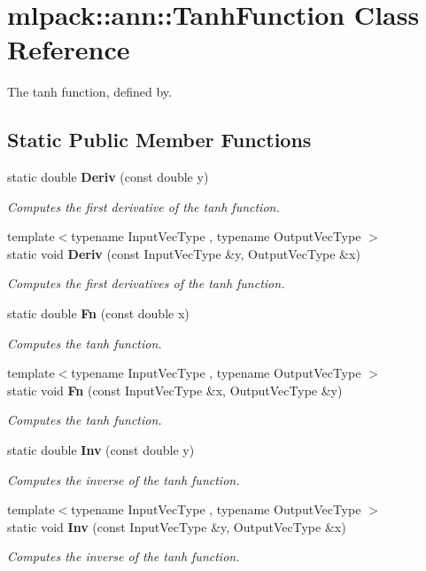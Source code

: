 \section{mlpack\+:\+:ann\+:\+:Tanh\+Function Class Reference}
\label{classmlpack_1_1ann_1_1TanhFunction}


The tanh function, defined by.  


\subsection*{Static Public Member Functions}
\begin{DoxyCompactItemize}
\item 
static double {\bf Deriv} (const double y)
\begin{DoxyCompactList}\small\item\em Computes the first derivative of the tanh function. \end{DoxyCompactList}\item 
{\footnotesize template$<$typename Input\+Vec\+Type , typename Output\+Vec\+Type $>$ }\\static void {\bf Deriv} (const Input\+Vec\+Type \&y, Output\+Vec\+Type \&x)
\begin{DoxyCompactList}\small\item\em Computes the first derivatives of the tanh function. \end{DoxyCompactList}\item 
static double {\bf Fn} (const double x)
\begin{DoxyCompactList}\small\item\em Computes the tanh function. \end{DoxyCompactList}\item 
{\footnotesize template$<$typename Input\+Vec\+Type , typename Output\+Vec\+Type $>$ }\\static void {\bf Fn} (const Input\+Vec\+Type \&x, Output\+Vec\+Type \&y)
\begin{DoxyCompactList}\small\item\em Computes the tanh function. \end{DoxyCompactList}\item 
static double {\bf Inv} (const double y)
\begin{DoxyCompactList}\small\item\em Computes the inverse of the tanh function. \end{DoxyCompactList}\item 
{\footnotesize template$<$typename Input\+Vec\+Type , typename Output\+Vec\+Type $>$ }\\static void {\bf Inv} (const Input\+Vec\+Type \&y, Output\+Vec\+Type \&x)
\begin{DoxyCompactList}\small\item\em Computes the inverse of the tanh function. \end{DoxyCompactList}\end{DoxyCompactItemize}


